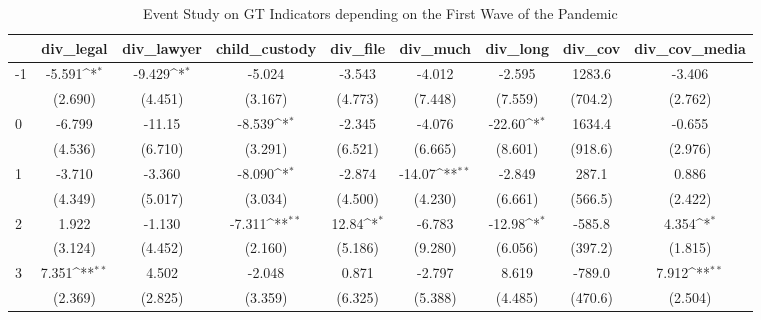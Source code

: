 \documentclass{article}
\begin{document}
{
\def\sym#1{\ifmmode^{#1}\else\(^{#1}\)\fi}
\begin{longtable}{l*{8}{c}}
\caption{Event Study on GT Indicators depending on the First Wave of the Pandemic}\\
\hline\hline\endfirsthead\hline\endhead\hline\endfoot\endlastfoot
                &\multicolumn{1}{c}{div\_legal}&\multicolumn{1}{c}{div\_lawyer}&\multicolumn{1}{c}{child\_custody}&\multicolumn{1}{c}{div\_file}&\multicolumn{1}{c}{div\_much}&\multicolumn{1}{c}{div\_long}&\multicolumn{1}{c}{div\_cov}&\multicolumn{1}{c}{div\_cov\_media}\\
\hline
-1              &   -5.591\sym{*}  &   -9.429\sym{*}  &   -5.024         &   -3.543         &   -4.012         &   -2.595         &   1283.6         &   -3.406         \\
                &  (2.690)         &  (4.451)         &  (3.167)         &  (4.773)         &  (7.448)         &  (7.559)         &  (704.2)         &  (2.762)         \\
0               &   -6.799         &   -11.15         &   -8.539\sym{*}  &   -2.345         &   -4.076         &   -22.60\sym{*}  &   1634.4         &   -0.655         \\
                &  (4.536)         &  (6.710)         &  (3.291)         &  (6.521)         &  (6.665)         &  (8.601)         &  (918.6)         &  (2.976)         \\
1               &   -3.710         &   -3.360         &   -8.090\sym{*}  &   -2.874         &   -14.07\sym{**} &   -2.849         &    287.1         &    0.886         \\
                &  (4.349)         &  (5.017)         &  (3.034)         &  (4.500)         &  (4.230)         &  (6.661)         &  (566.5)         &  (2.422)         \\
2               &    1.922         &   -1.130         &   -7.311\sym{**} &    12.84\sym{*}  &   -6.783         &   -12.98\sym{*}  &   -585.8         &    4.354\sym{*}  \\
                &  (3.124)         &  (4.452)         &  (2.160)         &  (5.186)         &  (9.280)         &  (6.056)         &  (397.2)         &  (1.815)         \\
3               &    7.351\sym{**} &    4.502         &   -2.048         &    0.871         &   -2.797         &    8.619         &   -789.0         &    7.912\sym{**} \\
                &  (2.369)         &  (2.825)         &  (3.359)         &  (6.325)         &  (5.388)         &  (4.485)         &  (470.6)         &  (2.504)         \\

\end{longtable}}
\end{document}
